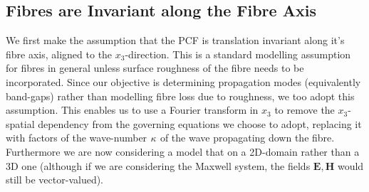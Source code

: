 \subsection{Fibres are Invariant along the Fibre Axis} \label{sec:ModellingAssumption1}
We first make the assumption that the PCF is translation invariant along it's fibre axis, aligned to the $x_3$-direction.
This is a standard modelling assumption for fibres in general unless surface roughness of the fibre needs to be incorporated.
Since our objective is determining propagation modes (equivalently band-gaps) rather than modelling fibre loss due to roughness, we too adopt this assumption.
This enables us to use a Fourier transform in $x_3$ to remove the $x_3$-spatial dependency from the governing equations we choose to adopt, replacing it with factors of the wave-number $\kappa$ of the wave propagating down the fibre.
Furthermore we are now considering a model that on a 2D-domain rather than a 3D one (although if we are considering the Maxwell system, the fields $\mathbf{E}, \mathbf{H}$ would still be vector-valued).

